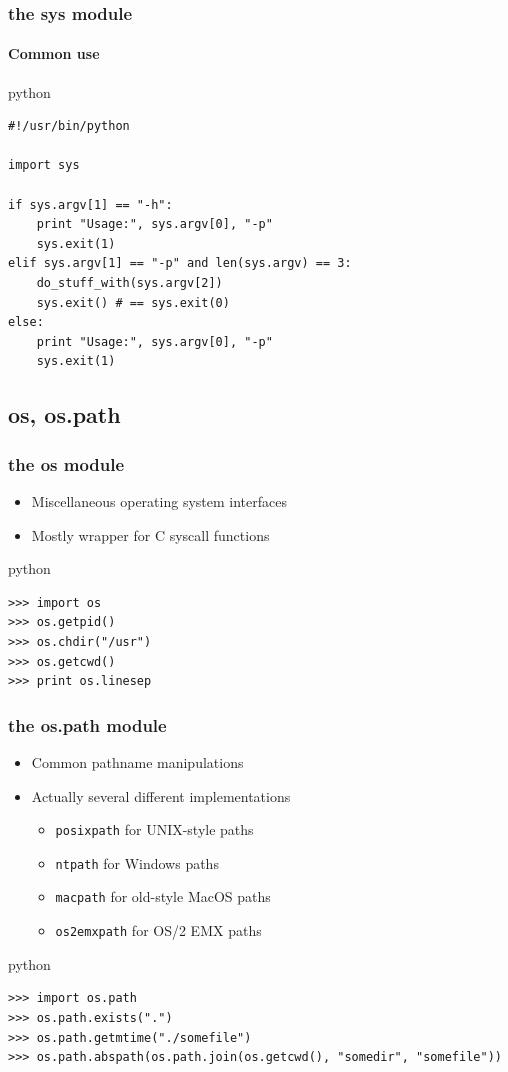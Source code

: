 \documentclass{beamer}
\begin{document}
\begin{frame}[fragile]
	\frametitle{the sys module}
	\framesubtitle{Common use}
    \begin{exampleblock}{python}
    \begin{lstlisting}
#!/usr/bin/python

import sys

if sys.argv[1] == "-h":
    print "Usage:", sys.argv[0], "-p"
    sys.exit(1)
elif sys.argv[1] == "-p" and len(sys.argv) == 3:
    do_stuff_with(sys.argv[2])
    sys.exit() # == sys.exit(0)
else:
    print "Usage:", sys.argv[0], "-p"
    sys.exit(1)
	\end{lstlisting}
    \end{exampleblock}
\end{frame}

\subsection{os, os.path} 
\begin{frame}[fragile]
	\frametitle{the os module}
	\begin{itemize}
	\item Miscellaneous operating system interfaces
	\item Mostly wrapper for C syscall functions
	\end{itemize}
	\begin{exampleblock}{python}
	\begin{lstlisting}
>>> import os
>>> os.getpid()
>>> os.chdir("/usr")
>>> os.getcwd()
>>> print os.linesep
	\end{lstlisting}
	\end{exampleblock}
\end{frame}

\begin{frame}[fragile]
	\frametitle{the os.path module}
	
	\begin{itemize}
	\item Common pathname manipulations
	\item Actually several different implementations
	\begin{itemize}
		\item \texttt{posixpath} for UNIX-style paths
		\item \texttt{ntpath} for Windows paths
		\item \texttt{macpath} for old-style MacOS paths
		\item \texttt{os2emxpath} for OS/2 EMX paths
	\end{itemize}
	\end{itemize}
	
	\begin{exampleblock}{python}
	\begin{lstlisting}
>>> import os.path
>>> os.path.exists(".")
>>> os.path.getmtime("./somefile")
>>> os.path.abspath(os.path.join(os.getcwd(), "somedir", "somefile"))
	\end{lstlisting}
	\end{exampleblock}
\end{frame}
\end{document}
